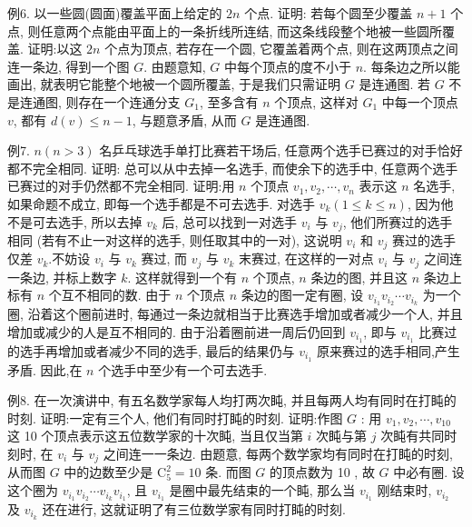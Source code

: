 例6. 以一些圆(圆面)覆盖平面上给定的 $2 n$ 个点.
证明: 若每个圆至少覆盖 $n+1$ 个点, 则任意两个点能由平面上的一条折线所连结, 而这条线段整个地被一些圆所覆盖.
证明:以这 $2 n$ 个点为顶点, 若存在一个圆, 它覆盖着两个点, 则在这两顶点之间连一条边, 得到一个图 $G$. 由题意知, $G$ 中每个顶点的度不小于 $n$. 每条边之所以能画出, 就表明它能整个地被一个圆所覆盖, 于是我们只需证明 $G$ 是连通图.
若 $G$ 不是连通图, 则存在一个连通分支 $G_1$, 至多含有 $n$ 个顶点, 这样对
$G_1$ 中每一个顶点 $v$, 都有 $d(v) \leqslant n-1$, 与题意矛盾, 从而 $G$ 是连通图.



例7. $n(n>3)$ 名乒乓球选手单打比赛若干场后, 任意两个选手已赛过的对手恰好都不完全相同.
证明: 总可以从中去掉一名选手, 而使余下的选手中, 任意两个选手已赛过的对手仍然都不完全相同.
证明:用 $n$ 个顶点 $v_1, v_2, \cdots, v_n$ 表示这 $n$ 名选手, 如果命题不成立, 即每一个选手都是不可去选手.
对选手 $v_k(1 \leqslant k \leqslant n)$, 因为他不是可去选手, 所以去掉 $v_k$ 后, 总可以找到一对选手 $v_i$ 与 $v_j$, 他们所赛过的选手相同 (若有不止一对这样的选手, 则任取其中的一对), 这说明 $v_i$ 和 $v_j$ 赛过的选手仅差 $v_k$.不妨设 $v_i$ 与 $v_k$ 赛过, 而 $v_j$ 与 $v_k$ 末赛过, 在这样的一对点 $v_i$ 与 $v_j$ 之间连一条边, 并标上数字 $k$. 这样就得到一个有 $n$ 个顶点, $n$ 条边的图, 并且这 $n$ 条边上标有 $n$ 个互不相同的数.
由于 $n$ 个顶点 $n$ 条边的图一定有圈, 设 $v_{i_1} v_{i_2} \cdots v_{i_k}$ 为一个圈, 沿着这个圈前进时, 每通过一条边就相当于比赛选手增加或者减少一个人, 并且增加或减少的人是互不相同的.
由于沿着圈前进一周后仍回到 $v_{i_1}$, 即与 $v_{i_1}$ 比赛过的选手再增加或者减少不同的选手, 最后的结果仍与 $v_{i_1}$ 原来赛过的选手相同,产生矛盾.
因此,在 $n$ 个选手中至少有一个可去选手.



例8. 在一次演讲中, 有五名数学家每人均打两次盹, 并且每两人均有同时在打盹的时刻.
证明:一定有三个人, 他们有同时打盹的时刻.
证明:作图 $G$ : 用 $v_1, v_2, \cdots, v_{10}$ 这 10 个顶点表示这五位数学家的十次盹, 当且仅当第 $i$ 次盹与第 $j$ 次盹有共同时刻时, 在 $v_i$ 与 $v_j$ 之间连一一条边.
由题意, 每两个数学家均有同时在打盹的时刻, 从而图 $G$ 中的边数至少是 $\mathrm{C}_5^2=10$ 条.
而图 $G$ 的顶点数为 10 , 故 $G$ 中必有圈.
设这个圈为 $v_{i_1} v_{i_2} \cdots v_{i_k} v_{i_1}$, 且 $v_{i_1}$ 是圈中最先结束的一个盹, 那么当 $v_{i_1}$ 刚结束时, $v_{i_2}$ 及 $v_{i_k}$ 还在进行, 这就证明了有三位数学家有同时打盹的时刻.



